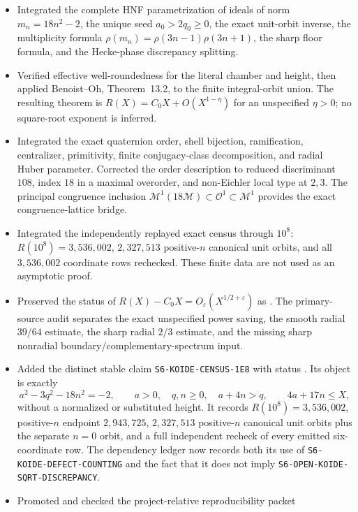 \begin{itemize}
\item Integrated the complete HNF parametrization of ideals of norm
\(m_n=18n^2-2\), the unique seed \(a_0>2q_0\geq0\), the exact unit-orbit
inverse, the multiplicity formula
\(\rho(m_n)=\rho(3n-1)\rho(3n+1)\), the sharp floor formula, and the
Hecke-phase discrepancy splitting.
\item Verified effective well-roundedness for the literal chamber and height,
then applied Benoist--Oh, Theorem~13.2, to the finite integral-orbit union.
The resulting theorem is
\(R(X)=C_0X+O(X^{1-\eta})\) for an unspecified \(\eta>0\); no square-root
exponent is inferred.
\item Integrated the exact quaternion order, shell bijection, ramification,
centralizer, primitivity, finite conjugacy-class decomposition, and radial
Huber parameter.  Corrected the order description to reduced discriminant
\(108\), index \(18\) in a maximal overorder, and non-Eichler local type at
\(2,3\).  The principal congruence inclusion
\(\mathcal M^1(18\mathcal M)\subset\mathcal O^1\subset\mathcal M^1\)
provides the exact congruence-lattice bridge.
\item Integrated the independently replayed exact census through \(10^8\):
\(R(10^8)=3{,}536{,}002\), \(2{,}327{,}513\) positive-\(n\) canonical
unit orbits, and all
\(3{,}536{,}002\) coordinate rows rechecked.  These finite data are not used
as an asymptotic proof.
\item Preserved the status of
\(R(X)-C_0X=O_\varepsilon(X^{1/2+\varepsilon})\) as \Open.  The
primary-source audit separates the exact unspecified power saving, the smooth
radial \(39/64\) estimate, the sharp radial \(2/3\) estimate, and the missing
sharp nonradial boundary/complementary-spectrum input.
\item Added the distinct stable claim
\texttt{S6-KOIDE-CENSUS-1E8} with status \Verified.  Its object is exactly
\[
 a^2-3q^2-18n^2=-2,\qquad a>0,\quad q,n\geq0,\quad a+4n>q,
 \qquad 4a+17n\leq X,
\]
without a normalized or substituted height.  It records
\(R(10^8)=3{,}536{,}002\), positive-\(n\) endpoint \(2{,}943{,}725\),
\(2{,}327{,}513\) positive-\(n\) canonical unit orbits plus the separate
\(n=0\) orbit, and a full
independent recheck of every emitted six-coordinate row.  The dependency
ledger now records both its use of \texttt{S6-KOIDE-DEFECT-COUNTING} and the
fact that it does not imply \texttt{S6-OPEN-KOIDE-SQRT-DISCREPANCY}.
\item Promoted and checked the project-relative reproducibility packet

\end{itemize}
